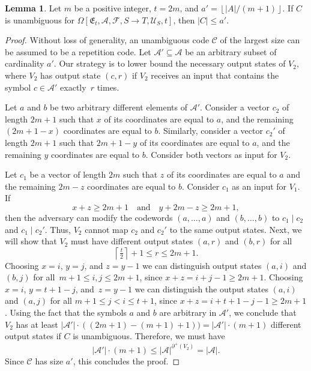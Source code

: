 \documentclass[11pt,a4paper]{article}
\theoremstyle{definition}
\newtheorem{lemma}[theorem]{Lemma}
\newcommand{\mC}{\mathcal{C}}
\newcommand{\mA}{\mathcal{A}}
\newcommand{\mF}{\mathcal{F}}
\newcommand{\mU}{\mathcal{U}}
\newcommand{\degout}{\partial^+}
\begin{document}
\begin{lemma}
\label{lemma-1}
Let $m$ be a positive integer, $t=2m$, and 
$a'=\left\lfloor |A|/(m+1) \right\rfloor$.
If $C$ is unambiguous for $\Omega[\mathfrak{E}_t,\mA,\mF,S \to T,\mU_S,t]$, then $|C| \le a'$.
\end{lemma}
\begin{proof}
Without loss of generality, an unambiguous code $\mC$ of the largest size can be assumed to be a repetition code. Let $\mathcal{A}'\subseteq\mathcal{A}$ be an arbitrary subset of cardinality $a'$. Our strategy is to lower bound the necessary output states of $V_2$, where $V_2$ has output state $(c,r)$ if $V_2$ receives an input that contains the symbol $c \in \mA'$ exactly~$r$ times. 

Let $a$ and $b$ be two arbitrary different elements of $\mathcal{A}'$. Consider a vector $c_2$ of length $2m+1$ such that $x$ of its coordinates are equal to $a$, and the remaining $(2m+1-x)$ coordinates are equal to $b$. Similarly, consider a vector $c_2'$ of length $2m+1$ such that $2m+1-y$ of its coordinates are equal to $a$, and the remaining $y$ coordinates are equal to $b$. Consider both vectors as input for $V_2$. 

Let $c_1$ be a vector of length $2m$ such that $z$ of its coordinates are equal to $a$ and the remaining $2m-z$ coordinates are equal to $b$. Consider $c_1$ as an input for 
  $V_1$. If 
  \begin{equation*}
    x+z\ge 2m+1 \quad\text{and}\quad y+2m-z \ge 2m+1, 
  \end{equation*}
  then the adversary can modify the codewords $(a, \dots, a)$ and $(b,\dots, b)$ to $c_1\mid c_2$ and $c_1 \mid c_2'$. Thus, $V_2$ cannot map $c_2$ and $c_2'$ to the same output states.
Next, we will show that $V_2$ must have different output states $(a,r)$ and $(b,r)$ for all $$\left\lceil\tfrac{t}{2}\right\rceil+1\le r\le 2m+1.$$ Choosing $x=i$, $y=j$, and $z=y-1$ we can distinguish output states $(a,i)$ and $(b,j)$ for all~$m+1\le i,j\le 2m+1$, since $x+z=i+j-1\ge 2m+1$. Choosing $x=i$, $y=t+1-j$, and~$z=y-1$ we can distinguish the output states $(a,i)$ and $(a,j)$ for all $m+1\le j<i\le t+1$, since $x+z=i+t+1-j-1\ge 2m+1$. Using the fact that the symbols $a$ and $b$ are arbitrary in $\mathcal{A}'$, 
  we conclude that $V_2$ has at least $\lvert \mathcal{A}' \rvert \cdot((2m+1)-(m+1)+1)) =\lvert \mathcal{A}'\rvert \cdot(m+1)$ different output states if $C$ is unambiguous. Therefore, we must have 
$$\lvert \mathcal{A}'\rvert \cdot(m+1) \le |\mA|^{\degout(V_2)}=|\mA|.$$ Since $\mC$ has size $a'$, this concludes the proof.
\end{proof}
\end{document}
